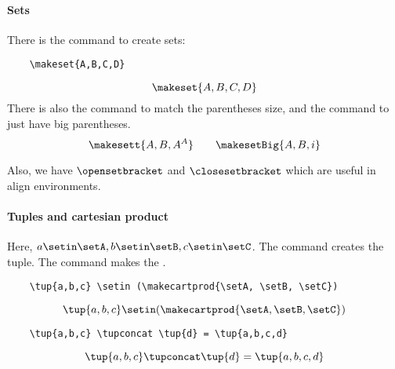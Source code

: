 \paragraph{Sets}
There is the command \str{\makeset} to create sets:
\begin{verbatim}
    \makeset{A,B,C,D}
\end{verbatim}
\begin{equation}
    \makeset{A,B,C,D}
\end{equation}
There is also the command \str{\makesett} to match the parentheses size, and the command\linebreak[1] \str{\makesetBig} to just have big parentheses.
\begin{equation}
    \makesett{A, B, A^A}
    \qquad
    \makesetBig{A, B, i}
\end{equation}

Also, we have \str{\opensetbracket} $\opensetbracket$ and \str{\closesetbracket} $\closesetbracket$ which are useful in align environments.

\paragraph{Tuples and cartesian product}
Here, $a\setin \setA, b \setin \setB, c \setin \setC$.
The command \str{\tup} creates the tuple.
The command \str{\makecartprod} makes the .
\begin{verbatim}
    \tup{a,b,c} \setin (\makecartprod{\setA, \setB, \setC})
\end{verbatim}
\begin{equation}
    \tup{a,b,c} \setin (\makecartprod{\setA, \setB, \setC})
\end{equation}
\begin{verbatim}
    \tup{a,b,c} \tupconcat \tup{d} = \tup{a,b,c,d}
\end{verbatim}
\begin{equation}
    \tup{a,b,c} \tupconcat \tup{d} = \tup{a,b,c,d}
\end{equation}


